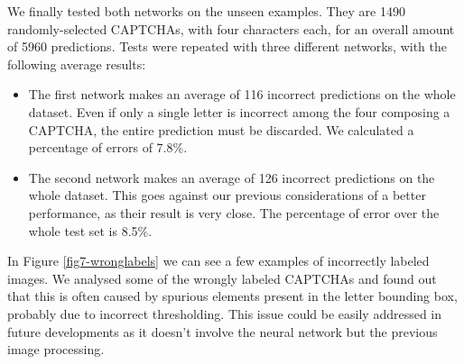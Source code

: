 We finally tested both networks on the unseen examples. They are 1490 randomly-selected CAPTCHAs, with four characters each, for an overall amount of 5960 predictions. Tests were repeated with three different networks, with the following average results:
\begin{itemize}
	\item The first network makes an average of 116 incorrect predictions on the whole dataset. Even if only a single letter is incorrect among the four composing a CAPTCHA, the entire prediction must be discarded. We calculated a percentage of errors of 7.8\%.
	\item The second network makes an average of 126 incorrect predictions on the whole dataset. This goes against our previous considerations of a better performance, as their result is very close. The percentage of error over the whole test set is 8.5\%.
\end{itemize}

In Figure \ref{fig7-wronglabels} we can see a few examples of incorrectly labeled images. We analysed some of the wrongly labeled CAPTCHAs and found out that this is often caused by spurious elements present in the letter bounding box, probably due to incorrect thresholding. This issue could be easily addressed in future developments as it doesn't involve the neural network but the previous image processing. 

